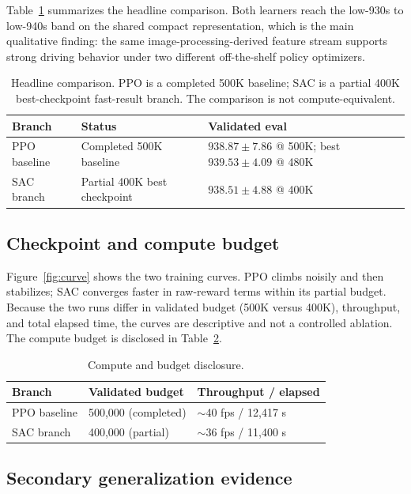 \documentclass[conference]{IEEEtran}
\begin{document}
Table~\ref{tab:headline} summarizes the headline comparison. Both learners reach
the low-930s to low-940s band on the shared compact representation, which is the
main qualitative finding: the same image-processing-derived feature stream
supports strong driving behavior under two different off-the-shelf policy
optimizers.

\begin{table}[t]
\caption{Headline comparison. PPO is a completed 500K baseline; SAC is a partial
400K best-checkpoint fast-result branch. The comparison is not compute-equivalent.}
\label{tab:headline}
\centering
\small
\begin{tabular}{l p{} p{}}
\toprule
Branch & Status & Validated eval \\
\midrule
PPO baseline & Completed 500K baseline & $938.87\pm7.86$ @ 500K; best $939.53\pm4.09$ @ 480K \\
SAC branch & Partial 400K best checkpoint & $938.51\pm4.88$ @ 400K \\
\bottomrule
\end{tabular}
\end{table}

\subsection{Checkpoint and compute budget}

Figure~\ref{fig:curve} shows the two training curves. PPO climbs noisily and
then stabilizes; SAC converges faster in raw-reward terms within its partial
budget. Because the two runs differ in validated budget (500K versus 400K),
throughput, and total elapsed time, the curves are descriptive and not a
controlled ablation. The compute budget is disclosed in Table~\ref{tab:compute}.

\begin{table}[t]
\caption{Compute and budget disclosure.}
\label{tab:compute}
\centering
\small
\begin{tabular}{lll}
\toprule
Branch & Validated budget & Throughput / elapsed \\
\midrule
PPO baseline & 500{,}000 (completed) & $\sim$40 fps / 12{,}417 s \\
SAC branch & 400{,}000 (partial) & $\sim$36 fps / 11{,}400 s \\
\bottomrule
\end{tabular}
\end{table}

\subsection{Secondary generalization evidence}
\end{document}
